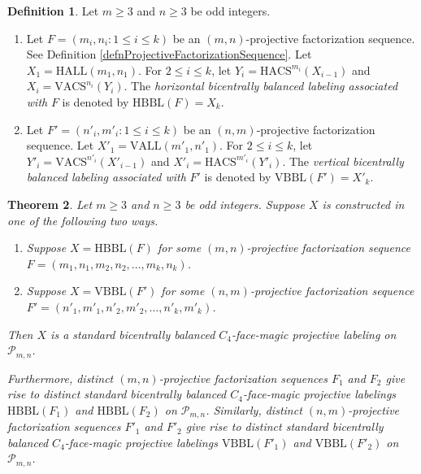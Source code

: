 \documentclass[12pt]{amsart}
\theoremstyle{definition}
\newtheorem{definition}{Definition}
\theoremstyle{plain}
\newtheorem{theorem}[definition]{Theorem}
\begin{document}
\begin{definition} \label{defnBicentrallyBalancedLabelingAssociatedWithF}
  Let $m\geqslant 3$ and $n\geqslant 3$ be odd integers.
   \begin{enumerate}
     \item Let $F= (m_i, n_i : 1 \leqslant i \leqslant k)$ be an $(m,n)$-projective factorization sequence.
     See Definition \ref{defnProjectiveFactorizationSequence}.
       Let $X_1 =\mathrm{HALL}(m_1,n_1)$.
       For $2 \leqslant i \leqslant k$, let $Y_i =\mathrm{HACS}^{m_i}(X_{i-1})$ and $X_i =\mathrm{VACS}^{n_i}(Y_{i})$.
       The \textit{horizontal bicentrally balanced labeling associated with} $F$ is denoted by $\mathrm{HBBL}(F)=X_k$.
      \item Let $F'= (n'_i, m'_i : 1 \leqslant i \leqslant k)$ be an $(n,m)$-projective factorization sequence.
       Let $X'_1 =\mathrm{VALL}(m'_1,n'_1)$.
       For $2 \leqslant i \leqslant k$, let $Y'_i =\mathrm{VACS}^{n'_i}(X'_{i-1})$ and $X'_i =\mathrm{HACS}^{m'_i}(Y'_{i})$.
       The \textit{vertical bicentrally balanced labeling associated with} $F'$ is denoted by $\mathrm{VBBL}(F')=X'_k$.
   \end{enumerate}
\end{definition}

\begin{theorem} \label{thmStandardProjectiveC4MagicBicentralConstruction}
  Let $m\geqslant 3$ and $n\geqslant 3$ be odd integers.
   Suppose $X$ is constructed in one of the following two ways.
   \begin{enumerate}
     \item Suppose $X= \mathrm{HBBL}(F)$ for some $(m,n)$-projective factorization sequence
     $F=(m_1,\allowbreak n_1,\allowbreak m_2,\allowbreak n_2,\ldots,m_{k},n_{k})$.
     \item Suppose $X= \mathrm{VBBL}(F')$ for some $(n,m)$-projective factorization sequence
     $F'=(n'_1,\allowbreak m'_1,\allowbreak n'_2,\allowbreak m'_2,\ldots,n'_{k},m'_{k})$.
   \end{enumerate}
    Then $X$ is a standard bicentrally balanced $C_4$-face-magic projective labeling on $\mathcal{P}_{m,n}$.

   Furthermore, distinct $(m,n)$-projective factorization sequences $F_1$ and $F_2$ give rise
   to distinct standard bicentrally balanced $C_4$-face-magic projective labelings $\mathrm{HBBL} \allowbreak (F_1)$ and $\mathrm{HBBL} \allowbreak (F_2)$ on $\mathcal{P}_{m,n}$.
   Similarly, distinct $(n,m)$-projective factorization sequences $F'_1$ and $F'_2$ give rise
   to distinct standard bicentrally balanced $C_4$-face-magic projective labelings $\mathrm{VBBL}(F'_1)$ and $\mathrm{VBBL}(F'_2)$ on $\mathcal{P}_{m,n}$.
\end{theorem}
\end{document}
